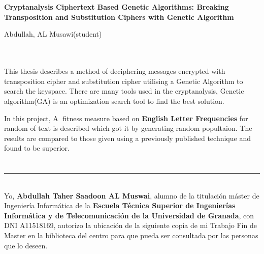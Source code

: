 \chapter*{}






\cleardoublepage

\thispagestyle{empty}


\begin{center}
{\large\bfseries Cryptanalysis Ciphertext Based Genetic Algorithms: Breaking Transposition and Substitution Ciphers with Genetic Algorithm}\\
\end{center}
\begin{center}
Abdullah, AL Musawi(student)\\
\end{center}

\\

\vspace{0.7cm}
\\

This thesis describes a method of deciphering messages encrypted with transposition cipher and substitution cipher utilising a Genetic Algorithm to search the keyspace.
There are many tools used in the cryptanalysis, Genetic algorithm(GA) is an optimization search tool to find the best solution.

In this project, A fitness measure based on \textbf{English Letter Frequencies} for random of text is described which got it by generating random popultaion. 
The results are compared to those given using a previously published technique and found to be superior.

\chapter*{}
\thispagestyle{empty}

\noindent\rule[-1ex]{\textwidth}{2pt}\\[4.5ex]

Yo, \textbf{Abdullah Taher Saadoon AL Muswai}, alumno de la titulación  máster de Ingeniería Informática  de la \textbf{Escuela Técnica Superior de Ingenierías Informática y de Telecomunicación de la Universidad de Granada}, con DNI A11518169, autorizo la
ubicación de la siguiente copia de mi Trabajo Fin de Master en la biblioteca del centro para que pueda ser
consultada por las personas que lo deseen.

